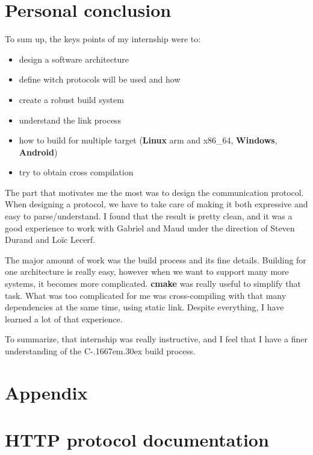 \documentclass[a4paper,11pt]{custom}
\newcommand{\cmake}{\textbf{cmake}\xspace}
\newcommand{\linux}{\textbf{Linux}\xspace}
\newcommand{\win}{\textbf{Windows}\xspace}
\newcommand{\android}{\textbf{Android}\xspace}
\newcommand{\cpp}{%
  C\kern-.1667em\raise.30ex\hbox{\smaller{++}}%
  \spacefactor1000\xspace%
}
\begin{document}
\chapter{Personal conclusion}

To sum up, the keys points of my internship were to:
\begin{multicols}{2}
\begin{itemize}
\item design a software architecture
\item define witch protocols will be used and how
\item create a robust build system
\item understand the link process
\item how to build for multiple target (\linux{} arm and x86\_64, \win, \android)
\item try to obtain cross compilation
\end{itemize}
\end{multicols}

The part that motivates me the most was to design the communication protocol.
When designing a protocol, we have to take care of making it both expressive and
easy to parse/understand. I found that the result is pretty clean, and it was a
good experience to work with Gabriel and Maud under the direction of Steven
Durand and Loïc Lecerf.

The major amount of work was the build process and its fine details. Building
for one architecture is really easy, however when we want to support many more
systems, it becomes more complicated. \cmake{} was really useful to simplify that
task. What was too complicated for me was cross-compiling with that many
dependencies at the same time, using static link. Despite everything, I have
learned a lot of that experience.

To summarize, that internship was really instructive, and I feel that I have a
finer understanding of the \cpp{} build process.

\appendix

\chapter*{Appendix}

\chapter{HTTP protocol documentation}
\label{sec:documentation}

\end{document}
